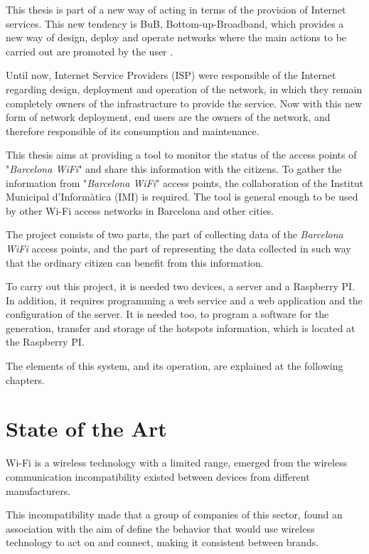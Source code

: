 \documentclass[12pt, a4paper,twoside]{tesi_upf}
\begin{document}
This thesis is part of a new way of acting in terms of the provision of Internet services. This new tendency is BuB, Bottom-up-Broadband, which provides a new way of design, deploy and operate networks where the main actions to be carried out are promoted by the user \cite{bubu}.

Until now, Internet Service Providers (ISP) were responsible of the Internet regarding design, deployment and operation of the network, in which they remain completely owners of the infrastructure to provide the service. Now with this new form of network deployment, end users are the owners of the network, and therefore responsible of its consumption and maintenance.

This thesis aims at providing a tool to monitor the status of the access points of "\emph{Barcelona WiFi}" and share this information with the citizens. To gather the information from "\emph{Barcelona WiFi}" access points, the collaboration of the Institut Municipal d'Informàtica (IMI) is required. The tool is general enough to be used by other Wi-Fi access networks in Barcelona and other cities.


The project consists of two parts, the part of collecting data of the \emph{Barcelona WiFi} access points, and the part of representing the data collected in such way that the ordinary citizen can benefit from this information. 

To carry out this project, it is needed two devices, a server and a Raspberry PI. In addition, it requires programming a web service and a web application and the configuration of the server. It is needed too, to program a software for the generation, transfer and storage of the hotspots information, which is located at the Raspberry PI.

The elements of this system, and its operation, are explained at the following chapters.
  
\chapter{State of the Art}
\label{Chapter2}

Wi-Fi is a wireless technology with a limited range, emerged from the wireless communication incompatibility existed between devices from different manufacturers.

This incompatibility made that a group of companies of this sector, found an association with the aim of define the behavior that would use wireless technology to act on and connect, making it consistent between brands. 
\end{document}
